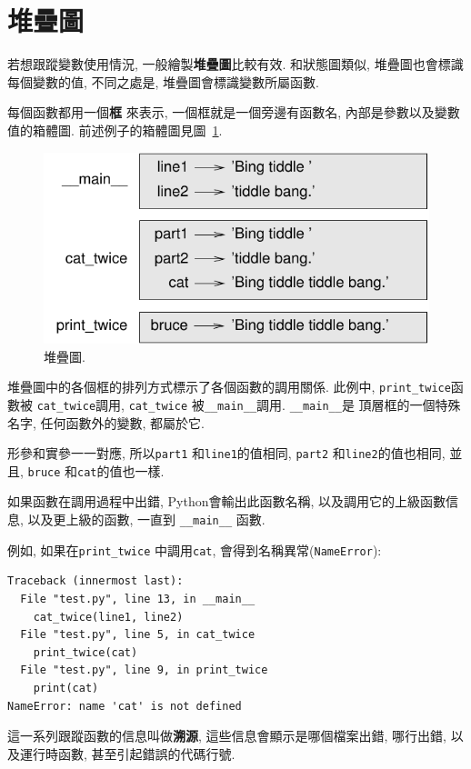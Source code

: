 \documentclass[10pt]{book}
\begin{document}
\section{堆疊圖}
\label{stackdiagram}
若想跟蹤變數使用情況, 一般繪製{\bf 堆疊圖}比較有效. 
和狀態圖類似, 堆疊圖也會標識每個變數的值, 不同之處是, 
堆疊圖會標識變數所屬函數. 

每個函數都用一個{\bf 框} 來表示, 一個框就是一個旁邊有函數名, 
內部是參數以及變數值的箱體圖. 
前述例子的箱體圖見圖~\ref{fig.stack}. 

\begin{figure}
\centerline
{\includegraphics[scale=0.8]{figs/stack.pdf}}
\caption{堆疊圖.}
\label{fig.stack}
\end{figure}

堆疊圖中的各個框的排列方式標示了各個函數的調用關係. 
此例中, \verb"print_twice"函數被 \verb"cat_twice"調用, 
\verb"cat_twice" 被\verb"__main__"調用. \verb"__main__"是
頂層框的一個特殊名字, 任何函數外的變數, 都屬於它. 

形參和實參一一對應, 所以{\tt part1} 和{\tt line1}的值相同, 
{\tt part2} 和{\tt line2}的值也相同, 並且, 
 {\tt bruce} 和{\tt cat}的值也一樣. 

如果函數在調用過程中出錯, Python會輸出此函數名稱, 
以及調用它的上級函數信息, 以及更上級的函數, 一直到 \verb"__main__" 函數.

例如, 如果在\verb"print_twice" 中調用{\tt cat}, 會得到名稱異常({\tt NameError}):

\begin{verbatim}
Traceback (innermost last):
  File "test.py", line 13, in __main__
    cat_twice(line1, line2)
  File "test.py", line 5, in cat_twice
    print_twice(cat)
  File "test.py", line 9, in print_twice
    print(cat)
NameError: name 'cat' is not defined
\end{verbatim}
%
這一系列跟蹤函數的信息叫做{\bf 溯源}, 這些信息會顯示是哪個檔案出錯, 哪行出錯, 
以及運行時函數, 甚至引起錯誤的代碼行號. 
\end{document}

